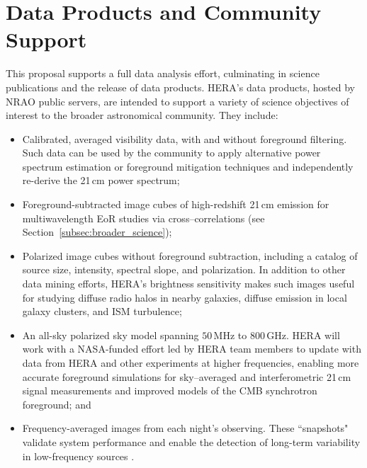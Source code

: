 \documentclass[preprint,11pt]{aastex}
\begin{document}

\vspace{-18pt}
\section{Data Products and Community Support}
\vspace{-5pt}
\label{sec:dataproducts}

\noindent This proposal supports a full data analysis effort, culminating in science publications
and the release of data products.  HERA's data products, hosted by NRAO public servers, 
are intended to support a variety of 
science objectives of interest to the broader astronomical community. They include:
\begin{itemize}[noitemsep,nolistsep,leftmargin=11pt]
\item Calibrated, averaged visibility data, with and without foreground filtering. Such data can be used by the community to apply alternative power spectrum estimation or foreground mitigation techniques and independently re-derive the 21\,cm power spectrum;
\item Foreground-subtracted image cubes of high-redshift 21\,cm emission for multiwavelength EoR studies via cross--correlations (see Section~\ref{subsec:broader_science});
\item Polarized image cubes without foreground subtraction, including a catalog of source size, intensity, spectral slope, and polarization.
In addition to other data mining efforts, HERA's brightness sensitivity makes such images 
useful for studying diffuse radio halos in nearby galaxies, diffuse emission
in local galaxy clusters, and ISM turbulence; 
\item An all-sky polarized sky model spanning $50\,\textrm{MHz}$ to $800\,\textrm{GHz}$. 
HERA will work with a NASA-funded effort led by HERA team members to
update \citet{deoliveira2008} with data from HERA and other experiments at higher frequencies,
enabling more accurate foreground simulations for 
sky--averaged and interferometric 21\,cm signal measurements and improved models of the CMB synchrotron foreground; and
\item Frequency-averaged images from each night's observing.  These ``snapshots" validate system performance and enable
the detection of long-term variability in low-frequency sources \citep[e.g., refractive scintillation of pulsars;][]{stinebring_et_al2000}.
\end{itemize}
\end{document}
